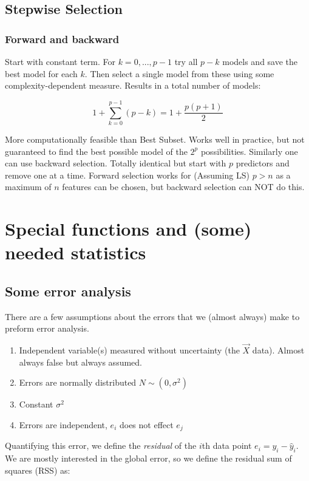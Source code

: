 \documentclass{article}
\begin{document}
\subsection{Stepwise Selection}
\subsubsection{Forward and backward}
Start with constant term. For $k = 0, ... , p-1$ try all $p-k$ models and save the best model for each $k$. Then select a single model from these using some complexity-dependent measure. Results in a total number of models:

\begin{equation*}
    1 + \sum_{k=0}^{p-1} (p-k) = 1 + \frac{p(p+1)}{2} 
\end{equation*}

More computationally feasible than Best Subset. Works well in practice, but not guaranteed to find the best possible model of the $2^p$ possibilities. Similarly one can use backward selection. Totally identical but start with $p$ predictors and remove one at a time. Forward selection works for (Assuming LS) $p > n$ as a maximum of $n$ features can be chosen, but backward selection can NOT do this.

\section{Special functions and (some) needed statistics}
\subsection{Some error analysis}
There are a few assumptions about the errors that we (almost always) make to preform error analysis.

\begin{enumerate}
    \item Independent variable(s) measured without uncertainty (the $\Vec{X}$ data). Almost always false but always assumed.
    \item Errors are normally distributed $N\sim(0,\sigma^2)$
    \item Constant $\sigma^2$ 
    \item Errors are independent, $e_i$ does not effect $e_j$ 
\end{enumerate}
Quantifying this error, we define the \textit{residual} of the $i$th data point $e_i = y_i-\hat{y}_i$. We are mostly interested in the global error, so we define the residual sum of squares (RSS) as:
\end{document}
